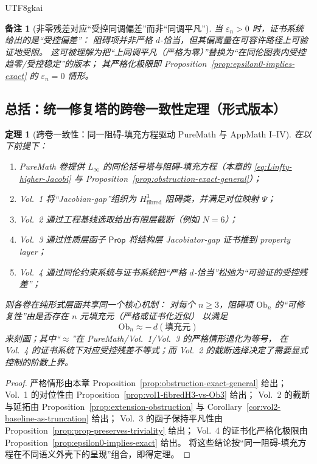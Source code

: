 \documentclass[12pt]{article}
\newtheorem{theorem}{定理}[section]
\newtheorem{remark}{备注}[section]
\newcommand{\Ob}{\mathrm{Ob}}
\newcommand{\Prop}{\mathsf{Prop}}
\begin{document}
\begin{CJK*}{UTF8}{gkai}
\begin{remark}[非零残差对应“受控同调偏差”而非“同调平凡”]
当 $\varepsilon_n>0$ 时，证书系统给出的是“受控偏差”：
阻碍项并非严格 $d$-恰当，但其偏离量在可容许路径上可验证地受限。
这可被理解为把“上同调平凡（严格为零）”替换为“在同伦图表内受控趋零/受控稳定”的版本；
其严格化极限即 Proposition~\ref{prop:epsilon0-implies-exact} 的 $\varepsilon_n=0$ 情形。
\end{remark}

\subsection{总括：统一修复塔的跨卷一致性定理（形式版本）}

\begin{theorem}[跨卷一致性：同一阻碍-填充方程驱动 PureMath 与 AppMath I--IV]
\label{thm:cross-volume-unified-mechanism}
在以下前提下：
\begin{enumerate}
  \item PureMath 卷提供 $L_\infty$ 的同伦括号塔与阻碍-填充方程（本章的
        \eqref{eq:Linfty-higher-Jacobi} 与 Proposition~\ref{prop:obstruction-exact-general}）；
  \item Vol.~1 将“Jacobian-gap”组织为 $H^3_{\mathrm{fibred}}$ 阻碍类，并满足对位映射 $\Psi$；
  \item Vol.~2 通过工程基线选取给出有限层截断（例如 $N=6$）；
  \item Vol.~3 通过性质层函子 $\Prop$ 将结构层 Jacobiator-gap 证书推到 property layer；
  \item Vol.~4 通过同伦约束系统与证书系统把“严格 $d$-恰当”松弛为“可验证的受控残差”；
\end{enumerate}
则各卷在纯形式层面共享同一个核心机制：
对每个 $n\ge 3$，阻碍项 $\Ob_n$ 的“可修复性”由是否存在 $n$ 元填充元（严格或证书化近似）
以满足
\[
  \Ob_n \approx -\,d(\text{填充元})
\]
来刻画；其中“$\approx$”在 PureMath/Vol.~1/Vol.~3 的严格情形退化为等号，
在 Vol.~4 的证书系统下对应受控残差不等式；而 Vol.~2 的截断选择决定了需要显式控制的阶数上界。
\end{theorem}

\begin{proof}
严格情形由本章 Proposition~\ref{prop:obstruction-exact-general} 给出；
Vol.~1 的对位性由 Proposition~\ref{prop:vol1-fibredH3-vs-Ob3} 给出；
Vol.~2 的截断与延拓由 Proposition~\ref{prop:extension-obstruction} 与
Corollary~\ref{cor:vol2-baseline-as-truncation} 给出；
Vol.~3 的函子保持平凡性由 Proposition~\ref{prop:prop-preserves-triviality} 给出；
Vol.~4 的证书化严格化极限由 Proposition~\ref{prop:epsilon0-implies-exact} 给出。
将这些结论按“同一阻碍-填充方程在不同语义外壳下的呈现”组合，即得定理。
\end{proof}


\end{CJK*}
\end{document}
